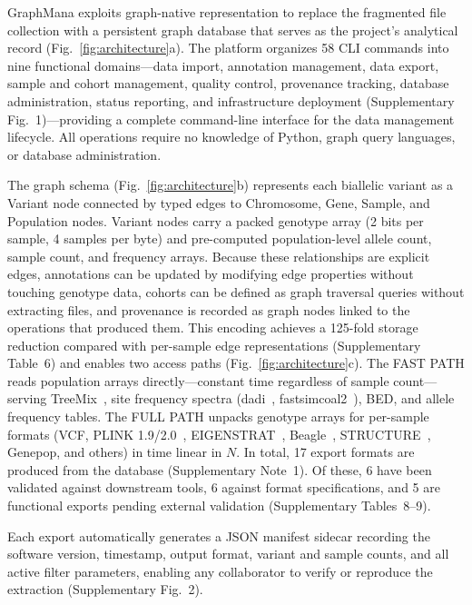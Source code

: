 \documentclass[pdflatex,sn-nature]{sn-jnl}
\begin{document}
GraphMana exploits graph-native representation to replace the fragmented file collection with a persistent graph database that serves as the project's analytical record (Fig.~\ref{fig:architecture}a). The platform organizes 58 CLI commands into nine functional domains---data import, annotation management, data export, sample and cohort management, quality control, provenance tracking, database administration, status reporting, and infrastructure deployment (Supplementary Fig.~1)---providing a complete command-line interface for the data management lifecycle. All operations require no knowledge of Python, graph query languages, or database administration.

The graph schema (Fig.~\ref{fig:architecture}b) represents each biallelic variant as a Variant node connected by typed edges to Chromosome, Gene, Sample, and Population nodes. Variant nodes carry a packed genotype array (2 bits per sample, 4 samples per byte) and pre-computed population-level allele count, sample count, and frequency arrays. Because these relationships are explicit edges, annotations can be updated by modifying edge properties without touching genotype data, cohorts can be defined as graph traversal queries without extracting files, and provenance is recorded as graph nodes linked to the operations that produced them. This encoding achieves a 125-fold storage reduction compared with per-sample edge representations (Supplementary Table~6) and enables two access paths (Fig.~\ref{fig:architecture}c). The FAST PATH reads population arrays directly---constant time regardless of sample count---serving TreeMix~\cite{pickrell2012treemix}, site frequency spectra (dadi~\cite{gutenkunst2009dadi}, fastsimcoal2~\cite{excoffier2021fsc}), BED, and allele frequency tables. The FULL PATH unpacks genotype arrays for per-sample formats (VCF, PLINK 1.9/2.0~\cite{chang2015plink}, EIGENSTRAT~\cite{patterson2006eigenstrat}, Beagle~\cite{browning2007beagle}, STRUCTURE~\cite{pritchard2000structure}, Genepop, and others) in time linear in $N$. In total, 17 export formats are produced from the database (Supplementary Note~1). Of these, 6 have been validated against downstream tools, 6 against format specifications, and 5 are functional exports pending external validation (Supplementary Tables~8--9).

Each export automatically generates a JSON manifest sidecar recording the software version, timestamp, output format, variant and sample counts, and all active filter parameters, enabling any collaborator to verify or reproduce the extraction (Supplementary Fig.~2).
\end{document}
